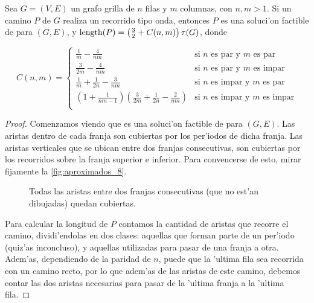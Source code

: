 \begin{theorem}
\label{th:onda}
Sea $G = (V, E)$ un grafo grilla de $n$ filas y $m$ columnas, con $n, m > 1$. Si un camino $P$ de $G$ realiza un recorrido tipo onda, entonces $P$ es una soluci'on factible de  para $(G, E)$, y $\textnormal{length}(P) = \left(\frac{3}{2} + C(n, m)\right) \tau(G)$, donde

\[
C(n, m) = \left\{
	\begin{array}{ll}
		\frac{1}{m} - \frac{4}{nm} & \mbox{si } n \text{ es par y } m \text{ es par}\\[1mm]

		\frac{3}{2m} - \frac{4}{nm} & \mbox{si } n \text{ es par y } m \text{ es impar}\\[1mm]
		
		\frac{1}{m} + \frac{1}{2n} - \frac{3}{nm} & \mbox{si } n \text{ es impar y } m \text{ es par}\\[1mm]
		
		\left(1 + \frac{1}{nm - 1}\right) \left(\frac{3}{2m} + \frac{1}{2n} - \frac{2}{nm}\right) & \mbox{si } n \text{ es impar y } m \text{ es impar}\\
	\end{array}
\right.
\]

\begin{proof}
Comenzamos viendo que es una soluci'on factible de  para $(G, E)$. Las aristas dentro de cada franja son cubiertas por los per'iodos de dicha franja. Las aristas verticales que se ubican entre dos franjas consecutivas, son cubiertas por los recorridos sobre la franja superior e inferior. Para convencerse de esto, mirar fijamente la \autoref{fig:aproximados_8}.

\begin{figure}[h]
	\begin{center}
		
	\end{center}
	\caption{Todas las aristas entre dos franjas consecutivas (que no est'an dibujadas) quedan cubiertas.}
	\label{fig:aproximados_8}
\end{figure}

Para calcular la longitud de $P$ contamos la cantidad de aristas que recorre el camino, dividi'endolas en dos clases: aquellas que forman parte de un per'iodo (quiz'as inconcluso), y aquellas utilizadas para pasar de una franja a otra. Adem'as, dependiendo de la paridad de $n$, puede que la 'ultima fila sea recorrida con un camino recto, por lo que adem'as de las aristas de este camino, debemos contar las dos aristas necesarias para pasar de la 'ultima franja a la 'ultima fila.


\end{proof}
\end{theorem}
